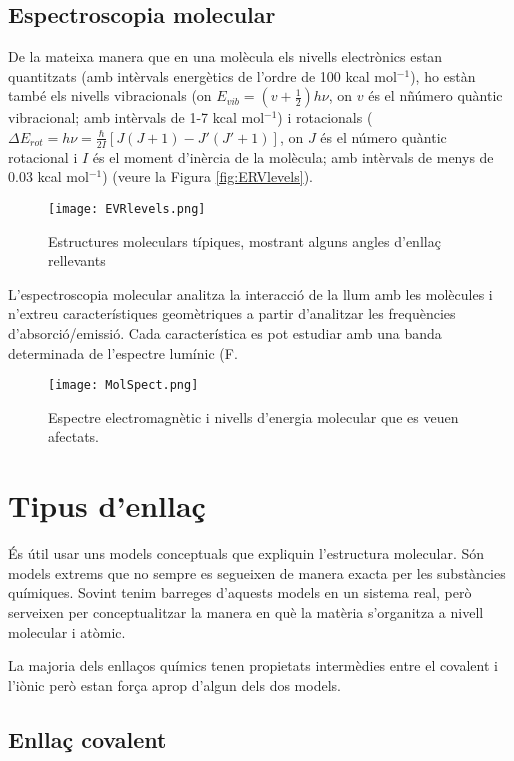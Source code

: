 \subsection{Espectroscopia molecular}

De la mateixa manera que en una molècula els nivells electrònics estan quantitzats (amb intèrvals energètics de l'ordre de 100 kcal mol$^{-1}$), ho estàn també els nivells vibracionals (on $E_{vib}=(v+\frac{1}{2})h\nu$, on $v$ és el nñúmero quàntic vibracional; amb intèrvals de 1-7 kcal mol$^{-1}$) i rotacionals ($\Delta E_{rot}=h \nu = \frac{\hbar}{2I}[J(J+1)-J'(J'+1)]$, on $J$ és el número quàntic rotacional i $I$ és el moment d'inèrcia de la molècula; amb intèrvals de menys de 0.03 kcal mol$^{-1}$) (veure la Figura \ref{fig:ERVlevels}).
\begin{figure}[h]
\centering
\texttt{[image: EVRlevels.png]}
\caption{Estructures moleculars típiques, mostrant alguns angles d'enllaç rellevants}
\label{fig:EVRlevels}
\end{figure}

L'espectroscopia molecular analitza la interacció de la llum amb les molècules i n'extreu característiques geomètriques a partir d'analitzar les frequències d'absorció/emissió.
Cada característica es pot estudiar amb una banda determinada de l'espectre lumínic (F.
\begin{figure}[h]
\centering
\texttt{[image: MolSpect.png]}
\caption{Espectre electromagnètic i nivells d'energia molecular que es veuen afectats.}
\label{fig:MolSpect}
\end{figure}

\section{Tipus d'enllaç}
És útil usar uns models conceptuals que expliquin l'estructura molecular. Són models extrems que no sempre es segueixen de manera exacta per les substàncies químiques. Sovint tenim barreges d'aquests models en un sistema real, però serveixen per conceptualitzar la manera en què la matèria s'organitza a nivell molecular i atòmic.

La majoria dels enllaços químics tenen propietats intermèdies entre el covalent i l'iònic però estan força aprop d'algun dels dos models.

\subsection{Enllaç covalent}

